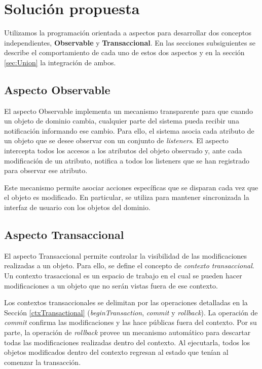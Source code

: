 \section{Solución propuesta}
\label{sec:Solucion}

	Utilizamos la programación orientada a aspectos para desarrollar dos
	conceptos independientes, {\bf Observable} y  {\bf Transaccional}.
	En las secciones subsiguientes se describe el comportamiento de cada uno de
	estos dos aspectos y en la sección \ref{sec:Union} la integración de ambos.

	\subsection{Aspecto Observable}
	\label{aspectoObservable}
		El aspecto Observable implementa un mecanismo transparente para que cuando un
		objeto de dominio cambia, cualquier parte del sistema pueda recibir una
		notificación informando ese cambio.
		Para ello, el sistema asocia cada atributo de un objeto que se desee observar
		con un conjunto de \emph{listeners}. 
		El aspecto intercepta todos los accesos a los atributos
		del objeto observado y, ante cada modificación de un atributo, notifica a todos
		los listeners que se han registrado para observar ese atributo.
		
		Este mecanismo permite asociar acciones específicas que se disparan cada vez
		que el objeto es modificado. En particular, se utiliza para mantener
		sincronizada la interfaz de usuario con los objetos del dominio.

	\subsection{Aspecto Transaccional}
	\label{aspectoTransaccional}
		El aspecto Transaccional permite controlar la visibilidad de las modificaciones
		realizadas a un objeto.
		Para ello, se define el concepto de \emph{contexto transaccional}.
		Un contexto trasaccional es un espacio de trabajo en el cual se pueden
		hacer modificaciones a un objeto que no serán vistas fuera de ese contexto.
	
		Los contextos transaccionales se delimitan por las
		operaciones detalladas en la Sección \ref{ctxTransactional}
		(\emph{beginTransaction}, \emph{commit} y \emph{rollback}).
		La operación de \emph{commit} confirma las modificaciones y las hace públicas
		fuera del contexto.
		Por su parte, la operación de \emph{rollback} provee un
		mecanismo automático para descartar todas las modificaciones realizadas
		dentro del contexto.
		Al ejecutarla, todos los objetos modificados dentro del contexto regresan al
		estado que tenían al comenzar la transacción.
		 
